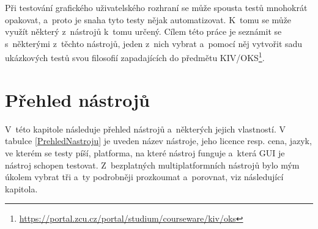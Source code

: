 \documentclass{bakalarka}
\begin{document}
Při testování grafického uživatelského rozhraní se může spousta testů mnohokrát opakovat, a~proto je snaha tyto testy nějak automatizovat. K~tomu se může využít některý z~nástrojů k~tomu určený. Cílem této práce je seznámit se s~některými z~těchto nástrojů, jeden z~nich vybrat a~pomocí něj vytvořit sadu ukázkových testů svou filosofií zapadajících do předmětu KIV/OKS\footnote{\url{https://portal.zcu.cz/portal/studium/courseware/kiv/oks}}.

\chapter{Přehled nástrojů}
V~této kapitole následuje přehled nástrojů a~některých jejich vlastností. V tabulce \ref{PrehledNastroju} je uveden název nástroje, jeho licence resp. cena, jazyk, ve kterém se testy píší, platforma, na které nástroj funguje a~která GUI je nástroj schopen testovat. Z~bezplatných multiplatformních nástrojů bylo mým úkolem vybrat tři a~ty podrobněji prozkoumat a~porovnat, viz následující kapitola.
\end{document}
